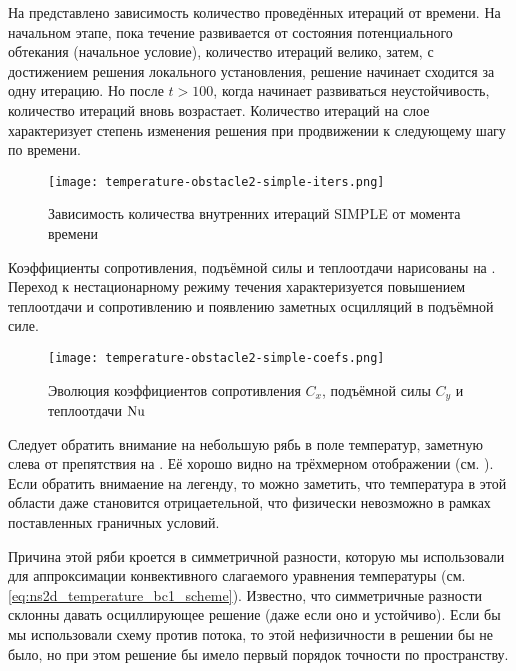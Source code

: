 На 
представлено зависимость количество проведённых итераций
от времени. На начальном этапе, пока течение
развивается от состояния потенциального обтекания (начальное условие),
количество итераций велико, затем, с достижением решения
локального установления, решение начинает сходится за одну итерацию.
Но после $t>100$, когда начинает развиваться неустойчивость, количество
итераций вновь возрастает. Количество итераций на слое характеризует
степень изменения решения при продвижении к следующему шагу по времени.

\begin{figure}[h!]
\centering
\texttt{[image: temperature-obstacle2-simple-iters.png]}
\caption{Зависимость количества внутренних итераций SIMPLE от момента времени}
\label{fig:temperature-obstacle2-simple-iters}
\end{figure}

Коэффициенты сопротивления, подъёмной силы и теплоотдачи нарисованы на .
Переход к нестационарному режиму течения характеризуется повышением теплоотдачи и сопротивлению
и появлению заметных осцилляций в подъёмной силе.

\begin{figure}[h!]
\centering
\texttt{[image: temperature-obstacle2-simple-coefs.png]}
\caption{Эволюция коэффициентов сопротивления $C_x$, подъёмной силы $C_y$ и теплоотдачи $\mathrm{Nu}$}
\label{fig:temperature-obstacle2-simple-coefs}
\end{figure}

Следует обратить внимание на небольшую рябь в поле температур, заметную
слева от препятствия на .
Её хорошо видно на трёхмерном отображении (см. ).
Если обратить внимаение на легенду, то можно заметить, что температура в этой
области даже становится отрицаетельной, что физически невозможно в рамках поставленных граничных условий.

Причина этой ряби кроется в симметричной разности, которую мы использовали
для аппроксимации конвективного слагаемого уравнения температуры (см. \cref{eq:ns2d_temperature_bc1_scheme}).
Известно, что симметричные разности склонны давать осциллирующее решение (даже если оно и устойчиво).
Если бы мы использовали схему против потока, то этой нефизичности в решении бы не было,
но при этом решение бы имело первый порядок точности по пространству.


